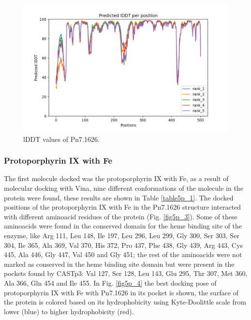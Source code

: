 \documentclass[12pt]{article}
\begin{document}
	\FloatBarrier
	\begin{figure}
		\centering
		\includegraphics[width=\textwidth-50pt]{../5/propose/AlphaFold2/test_c0c6c_plddt.png}
		\caption{\centering lDDT values of Pn7.1626.}
		\label{fig5p_2}
	\end{figure}
	\FloatBarrier
	
	
	\subsubsection{Protoporphyrin IX with Fe}
	
	The first molecule docked was the protoporphyrin IX with Fe, as a result of molecular docking with Vina, nine different conformations of the molecule in the protein were found, these results are shown in Table \ref{table5p_1}. The docked positions of the protoporphyrin IX with Fe in the Pn7.1626 structure interacted with different aminoacid residues of the protein (Fig. \ref{fig5p_3}). Some of these aminoacids were found in the conserved domain for the heme binding site of the enzyme, like Arg 111, Leu 148, Ile 197, Leu 296, Leu 299, Gly 300, Ser 303, Ser 304, Ile 365, Ala 369, Val 370, His 372, Pro 437, Phe 438, Gly 439, Arg 443, Cys 445, Ala 446, Gly 447, Val 450 and Gly 451; the rest of the aminoacids were not marked as conserved in the heme binding site domain but were present in the pockets found by CASTp3: Val 127, Ser 128, Leu 143, Glu 295, Thr 307, Met 360, Ala 366, Gln 454 and Ile 455. In Fig. \ref{fig5p_4} the best docking pose of protoporphyrin IX with Fe with Pn7.1626 in its pocket is shown, the surface of the protein is colored based on its hydrophobicity using Kyte-Doolittle scale from lower (blue) to higher hydrophobicity (red).
	
	
	
\end{document}
